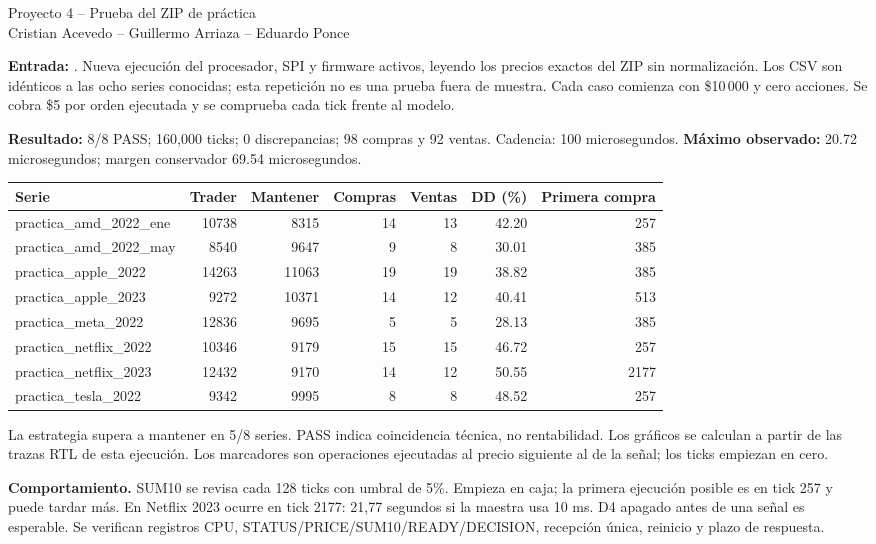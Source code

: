 \documentclass[10pt,a4paper]{article}
\begin{document}
\begin{center}{\LARGE Proyecto 4 -- Prueba del ZIP de práctica}\\[6pt]
Cristian Acevedo -- Guillermo Arriaza -- Eduardo Ponce\end{center}
\textbf{Entrada:} . Nueva ejecución del procesador,
SPI y firmware activos, leyendo los precios exactos del ZIP sin normalización.
Los CSV son idénticos a las ocho series conocidas; esta repetición no es una
prueba fuera de muestra. Cada caso comienza con \$10\,000 y cero acciones.
Se cobra \$5 por orden ejecutada y se comprueba cada tick frente al modelo.

\textbf{Resultado:} 8/8 PASS; 160,000 ticks; 0 discrepancias; 98 compras y 92 ventas. Cadencia: 100 microsegundos. 
\textbf{Máximo observado:} 20.72 microsegundos; margen conservador 69.54 microsegundos.


\begin{center}\scriptsize\begin{tabular}{lrrrrrr}\toprule
Serie & Trader & Mantener & Compras & Ventas & DD (\%) & Primera compra \\\midrule
practica\_amd\_2022\_ene & 10738 & 8315 & 14 & 13 & 42.20 & 257 \\
practica\_amd\_2022\_may & 8540 & 9647 & 9 & 8 & 30.01 & 385 \\
practica\_apple\_2022 & 14263 & 11063 & 19 & 19 & 38.82 & 385 \\
practica\_apple\_2023 & 9272 & 10371 & 14 & 12 & 40.41 & 513 \\
practica\_meta\_2022 & 12836 & 9695 & 5 & 5 & 28.13 & 385 \\
practica\_netflix\_2022 & 10346 & 9179 & 15 & 15 & 46.72 & 257 \\
practica\_netflix\_2023 & 12432 & 9170 & 14 & 12 & 50.55 & 2177 \\
practica\_tesla\_2022 & 9342 & 9995 & 8 & 8 & 48.52 & 257 \\
\bottomrule\end{tabular}\end{center}
La estrategia supera a mantener en 5/8 series.
PASS indica coincidencia técnica, no rentabilidad. Los gráficos se calculan a
partir de las trazas RTL de esta ejecución. Los marcadores son operaciones
ejecutadas al precio siguiente al de la señal; los ticks empiezan en cero.

\textbf{Comportamiento.} SUM10 se revisa cada 128 ticks con umbral de 5\%.
Empieza en caja; la primera ejecución posible es en tick 257 y puede tardar más.
En Netflix 2023 ocurre en tick 2177: 21,77 segundos si la maestra usa 10 ms.
D4 apagado antes de una señal es esperable. Se verifican registros CPU,
STATUS/PRICE/SUM10/READY/DECISION, recepción única, reinicio y plazo de respuesta.
\end{document}
